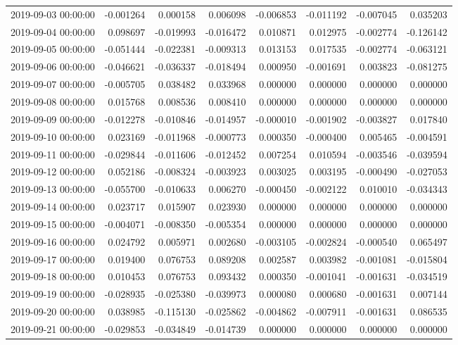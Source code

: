 \begin{tabular}{lrrrrrrr}
2019-09-03 00:00:00 & -0.001264 & 0.000158 & 0.006098 & -0.006853 & -0.011192 & -0.007045 & 0.035203 \\
2019-09-04 00:00:00 & 0.098697 & -0.019993 & -0.016472 & 0.010871 & 0.012975 & -0.002774 & -0.126142 \\
2019-09-05 00:00:00 & -0.051444 & -0.022381 & -0.009313 & 0.013153 & 0.017535 & -0.002774 & -0.063121 \\
2019-09-06 00:00:00 & -0.046621 & -0.036337 & -0.018494 & 0.000950 & -0.001691 & 0.003823 & -0.081275 \\
2019-09-07 00:00:00 & -0.005705 & 0.038482 & 0.033968 & 0.000000 & 0.000000 & 0.000000 & 0.000000 \\
2019-09-08 00:00:00 & 0.015768 & 0.008536 & 0.008410 & 0.000000 & 0.000000 & 0.000000 & 0.000000 \\
2019-09-09 00:00:00 & -0.012278 & -0.010846 & -0.014957 & -0.000010 & -0.001902 & -0.003827 & 0.017840 \\
2019-09-10 00:00:00 & 0.023169 & -0.011968 & -0.000773 & 0.000350 & -0.000400 & 0.005465 & -0.004591 \\
2019-09-11 00:00:00 & -0.029844 & -0.011606 & -0.012452 & 0.007254 & 0.010594 & -0.003546 & -0.039594 \\
2019-09-12 00:00:00 & 0.052186 & -0.008324 & -0.003923 & 0.003025 & 0.003195 & -0.000490 & -0.027053 \\
2019-09-13 00:00:00 & -0.055700 & -0.010633 & 0.006270 & -0.000450 & -0.002122 & 0.010010 & -0.034343 \\
2019-09-14 00:00:00 & 0.023717 & 0.015907 & 0.023930 & 0.000000 & 0.000000 & 0.000000 & 0.000000 \\
2019-09-15 00:00:00 & -0.004071 & -0.008350 & -0.005354 & 0.000000 & 0.000000 & 0.000000 & 0.000000 \\
2019-09-16 00:00:00 & 0.024792 & 0.005971 & 0.002680 & -0.003105 & -0.002824 & -0.000540 & 0.065497 \\
2019-09-17 00:00:00 & 0.019400 & 0.076753 & 0.089208 & 0.002587 & 0.003982 & -0.001081 & -0.015804 \\
2019-09-18 00:00:00 & 0.010453 & 0.076753 & 0.093432 & 0.000350 & -0.001041 & -0.001631 & -0.034519 \\
2019-09-19 00:00:00 & -0.028935 & -0.025380 & -0.039973 & 0.000080 & 0.000680 & -0.001631 & 0.007144 \\
2019-09-20 00:00:00 & 0.038985 & -0.115130 & -0.025862 & -0.004862 & -0.007911 & -0.001631 & 0.086535 \\
2019-09-21 00:00:00 & -0.029853 & -0.034849 & -0.014739 & 0.000000 & 0.000000 & 0.000000 & 0.000000 \\

\end{tabular}
